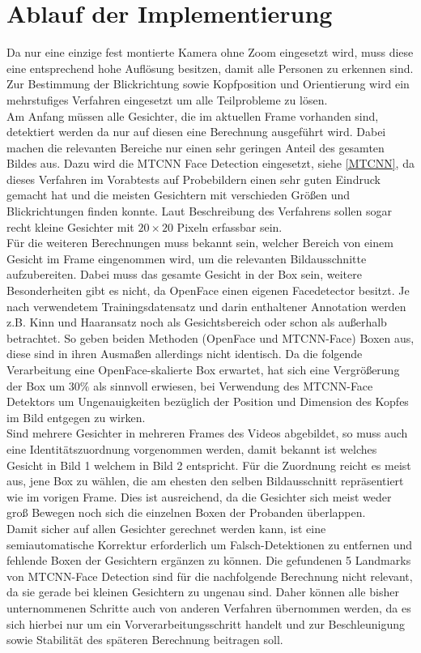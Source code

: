 \section{Ablauf der Implementierung}

Da nur eine einzige fest montierte Kamera ohne Zoom eingesetzt wird, muss diese eine entsprechend hohe Auflösung besitzen, damit alle Personen zu erkennen sind. Zur Bestimmung der Blickrichtung sowie Kopfposition und Orientierung wird ein mehrstufiges Verfahren eingesetzt um alle Teilprobleme zu lösen.\\
Am Anfang müssen alle Gesichter, die im aktuellen Frame vorhanden sind, detektiert werden da nur auf diesen eine Berechnung ausgeführt wird.
Dabei machen die relevanten Bereiche nur einen sehr geringen Anteil des gesamten Bildes aus. Dazu wird die MTCNN Face Detection eingesetzt, siehe \autoref{MTCNN}, da dieses Verfahren im Vorabtests auf Probebildern einen sehr guten Eindruck gemacht hat und die meisten Gesichtern mit verschieden Größen und Blickrichtungen finden konnte. Laut Beschreibung des Verfahrens sollen sogar recht kleine Gesichter mit $20\times 20$ Pixeln erfassbar sein.\\
Für die weiteren Berechnungen muss bekannt sein, welcher Bereich von einem Gesicht im Frame eingenommen wird, um die relevanten Bildausschnitte aufzubereiten. Dabei muss das gesamte Gesicht in der Box sein, weitere Besonderheiten gibt es nicht, da OpenFace einen eigenen Facedetector besitzt. Je nach verwendetem Trainingsdatensatz und darin enthaltener Annotation werden z.B. Kinn und Haaransatz noch als Gesichtsbereich oder schon als außerhalb betrachtet. So geben beiden Methoden (OpenFace und MTCNN-Face) Boxen aus, diese sind in ihren Ausmaßen allerdings nicht identisch. Da die folgende Verarbeitung eine OpenFace-skalierte Box erwartet, hat sich eine Vergrößerung der Box um $30\%$ als sinnvoll erwiesen, bei Verwendung des MTCNN-Face Detektors um Ungenauigkeiten bezüglich der Position und Dimension des Kopfes im Bild entgegen zu wirken.\\
Sind mehrere Gesichter in mehreren Frames des Videos abgebildet, so muss auch eine Identitätszuordnung vorgenommen werden, damit bekannt ist welches Gesicht in Bild 1 welchem in Bild 2 entspricht. Für die Zuordnung reicht es meist aus, jene Box zu wählen, die am ehesten den selben Bildausschnitt repräsentiert wie im vorigen Frame. Dies ist ausreichend, da die Gesichter sich meist weder groß Bewegen noch sich die einzelnen Boxen der Probanden überlappen.\\
Damit sicher auf allen Gesichter gerechnet werden kann, ist eine semiautomatische Korrektur erforderlich um Falsch-Detektionen zu entfernen und fehlende Boxen der Gesichtern ergänzen zu können. Die gefundenen 5 Landmarks von MTCNN-Face Detection sind für die nachfolgende Berechnung nicht relevant, da sie gerade bei kleinen Gesichtern zu ungenau sind. Daher können alle bisher unternommenen Schritte auch von anderen Verfahren übernommen werden, da es sich hierbei nur um ein Vorverarbeitungsschritt handelt und zur Beschleunigung sowie Stabilität des späteren Berechnung beitragen soll.\\
